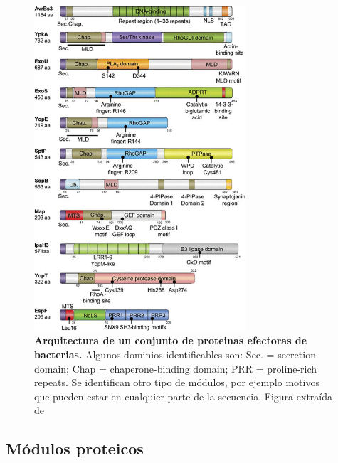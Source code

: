 \begin{figure}[htbp,centered]
\centering
\includegraphics[width=0.7\textwidth]{img/architecture.jpg} 
\caption{\textbf{Arquitectura de un conjunto de proteinas efectoras de bacterias.} Algunos dominios identificables son: Sec. = secretion domain; Chap = chaperone-binding domain; PRR = proline-rich repeats. 
Se identifican otro tipo de módulos, por ejemplo motivos que pueden estar en cualquier parte de la secuencia. Figura extraída de \cite{dean2011functional}} 
\label{arquitectura}
\end{figure}














\subsection{Módulos proteicos} \label{modulosProteicos}

